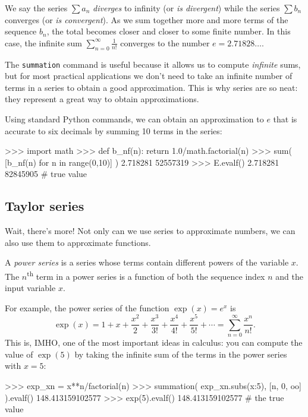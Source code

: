 \noindent
We say the series $\sum a_n$ \emph{diverges} to infinity (or \emph{is divergent})								
while the series $\sum b_n$ converges (or \emph{is convergent}).											
As we sum together more and more terms of the sequence $b_n$, the total becomes closer and closer to some finite number.
In this case, the infinite sum $\sum_{n=0}^\infty \frac{1}{n!}$ converges to the number $e=2.71828\ldots$.


The \texttt{summation} command is useful because it allows us to compute \emph{infinite} sums,
but for most practical applications we don't need to take an infinite number of terms in a series to obtain a good approximation. 
This is why series are so neat: they represent a great way to obtain approximations.

Using standard Python commands,  
we can obtain an approximation to $e$ that is accurate to six decimals by summing 10 terms in the series: 

\small
\begin{verbatimtab}
>>> import math
>>> def b_nf(n): 
        return 1.0/math.factorial(n)
>>> sum( [b_nf(n) for n in range(0,10)] )
2.718281 52557319
>>> E.evalf()
2.718281 82845905       # true value
\end{verbatimtab}
\normalsize
\subsection{Taylor series}
\label{calculus:taylor_series}

Wait, there's more! 
Not only can we use series to approximate numbers,
we can also use them to approximate functions.

A \emph{power series} is a series whose terms contain different powers of the variable $x$.						
The $n$\textsuperscript{th} term in a power series is a function of both the sequence index $n$ and the input variable $x$.

For example, the power series of the function $\exp(x)=e^x$ is 
\[
 \exp(x)	=	1 + x + \frac{x^2}{2} + \frac{x^3}{3!} + \frac{x^4}{4!} + \frac{x^5}{5!} + \cdots         
		= 	\sum_{n=0}^\infty \frac{x^n}{n!}.
\]
This is, IMHO, one of the most important ideas in calculus:
you can compute the value of $\exp(5)$ by taking the infinite sum of the terms in the power series with $x=5$:



\small
\begin{verbatimtab}
>>> exp_xn = x**n/factorial(n)
>>> summation( exp_xn.subs({x:5}), [n, 0, oo] ).evalf()
148.413159102577
>>> exp(5).evalf()
148.413159102577        # the true value
\end{verbatimtab}
\normalsize

